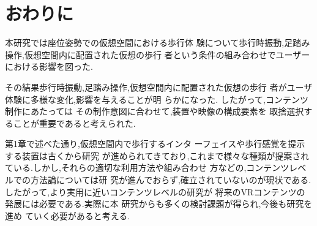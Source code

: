 \documentclass[uplatex]{jsarticle}   %
\begin{document}
\section{おわりに}
本研究では座位姿勢での仮想空間における歩行体
験について歩行時振動,足踏み操作,仮想空間内に配置された仮想の歩行
者という条件の組み合わせでユーザーにおける影響を図った.

その結果歩行時振動,足踏み操作,仮想空間内に配置された仮想の歩行
者がユーザ体験に多様な変化,影響を与えることが明
らかになった.
したがって,コンテンツ制作にあたっては
その制作意図に合わせて,装置や映像の構成要素を
取捨選択することが重要であると考えられた.

第1章で述べた通り,仮想空間内で歩行するインタ
ーフェイスや歩行感覚を提示する装置は古くから研究
が進められてきており,これまで様々な種類が提案され
ている.しかし,それらの適切な利用方法や組み合わせ
方などの,コンテンツレベルでの方法論については研
究が進んでおらず,確立されていないのが現状である.
したがって,より実用に近いコンテンツレベルの研究が
将来のVRコンテンツの発展には必要である.実際に本
研究からも多くの検討課題が得られ,今後も研究を進め
ていく必要があると考える.










\end{document}
